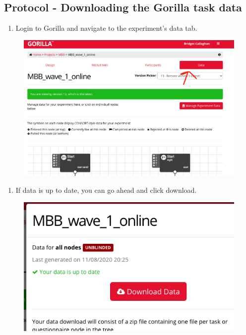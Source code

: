 \documentclass[]{book}
\providecommand{\tightlist}{%
  \setlength{\itemsep}{0pt}\setlength{\parskip}{0pt}}
\begin{document}
\hypertarget{protocol---downloading-the-gorilla-task-data}{%
\subsection{Protocol - Downloading the Gorilla task data}\label{protocol---downloading-the-gorilla-task-data}}

\begin{enumerate}
\def\labelenumi{\arabic{enumi}.}
\tightlist
\item
  Login to Gorilla and navigate to the experiment's data tab.
\end{enumerate}

\begin{figure}
\centering
\includegraphics{images/gorilla/6.png}
\caption{}
\end{figure}

\begin{enumerate}
\def\labelenumi{\arabic{enumi}.}
\setcounter{enumi}{1}
\tightlist
\item
  If data is up to date, you can go ahead and click download.
\end{enumerate}

\begin{figure}
\centering
\includegraphics{images/gorilla/7.png}
\caption{}
\end{figure}
\end{document}
